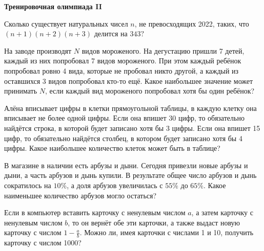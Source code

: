 \centerline{\bf \Huge Тренировочная олимпиада II}
\centerline{\bf \Huge }

\begin{flushright}
        \scriptsize{}
\end{flushright}

Сколько существует натуральных чисел $n$, не превосходящих 2022, таких, что $(n+1)(n+ 2)(n+3)$ делится на $343 ?$

На заводе производят $N$ видов мороженого. На дегустацию пришли 7 детей, каждый из них попробовал 7 видов мороженого. При этом каждый ребёнок попробовал ровно 4 вида, которые не пробовал никто другой, а каждый из оставшихся 3 видов попробовал кто-то ещё. Какое наибольшее значение может принимать $N$, если каждый вид мороженого попробовал хотя бы один ребёнок?

Алёна вписывает цифры в клетки прямоугольной таблицы, в каждую клетку она вписывает не более одной цифры. Если она впишет 30 цифр, то обязательно найдётся строка, в которой будет записано хотя бы 3 цифры. Если она впишет 15 цифр, то обязательно найдётся столбец, в котором будет записано хотя бы 4 цифры. Какое наибольшее количество клеток может быть в таблице?

В магазине в наличии есть арбузы и дыни. Сегодня привезли новые арбузы и дыни, а часть арбузов и дынь купили. В результате общее число арбузов и дынь сократилось на $10 \%$, а доля арбузов увеличилась с $55 \%$ до $65 \%$. Какое наименьшее количество арбузов могло остаться?

Если в компьютер вставить карточку с ненулевым числом $a$, а затем карточку с ненулевым числом $b$, то он вернёт обе эти карточки, а также выдаст новую карточку с числом $1-\frac{a}{b}$. Можно ли, имея карточки с числами 1 и 10, получить карточку с числом 1000?